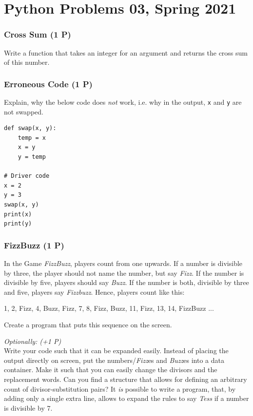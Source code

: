 \documentclass[
	english,
	fontsize=10pt,
	parskip=half,
	titlepage=true,
	DIV=12
]{scrartcl}
\newcommand*{\ie}{i.\;e. }
\begin{document}
\part*{Python Problems 03, Spring 2021}
\section{Cross Sum (1 P)}
Write a function that takes an integer for an argument and returns the cross sum of this number.

\section{Erroneous Code (1 P)}
Explain, why the below code does \emph{not} work, \ie why in the output, \texttt{x} and \texttt{y} are not swapped.
\begin{verbatim}
def swap(x, y): 
    temp = x
    x = y
    y = temp
  
# Driver code 
x = 2
y = 3
swap(x, y) 
print(x) 
print(y) 
\end{verbatim}


\section{FizzBuzz (1 P)}
In the Game \emph{FizzBuzz}, players count from one upwards. If a number is divisible by three, the player should not name the number, but say \emph{Fizz}. If the number is divisible by five, players should say \emph{Buzz}. If the number is both, divisible by three and five, players say \emph{Fizzbuzz}. Hence, players count like this:
\begin{center}
	1, 2, Fizz, 4, Buzz, Fizz, 7, 8, Fizz, Buzz, 11, Fizz, 13, 14, FizzBuzz ...
\end{center}

Create a program that puts this sequence on the screen.

\emph{Optionally: (+1 P)}\\
Write your code such that it can be expanded easily. Instead of placing the output directly on screen, put the numbers/\emph{Fizz}es and \emph{Buzz}es into a data container. Make it such that you can easily change the divisors and the replacement words. Can you find a structure that allows for defining an arbitrary count of divisor-substitution pairs? It \emph{is} possible to write a program, that, by adding only a single extra line, allows to expand the rules to say \emph{Tess} if a number is divisible by 7.
\end{document}
